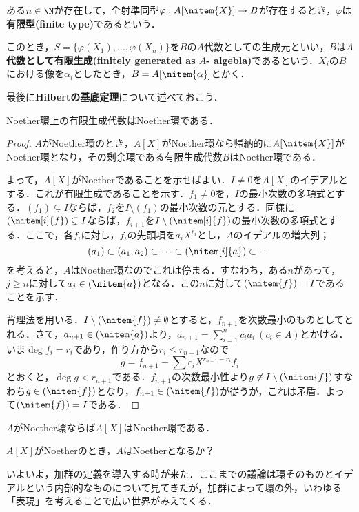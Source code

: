 \begin{defi}[有限型]
	ある$n\in\N$が存在して，全射準同型$\varphi:A[\nitem{X}]\to B$が存在するとき，$\varphi$は\textbf{有限型(finite type)}であるという．
\end{defi}

このとき，$S=\{\varphi(X_1),\dots,\varphi(X_n)\}$を$B$の$A$代数としての生成元といい，$B$は$A$\textbf{代数として有限生成(finitely generated as $A$- algebla)}であるという．$X_i$の$B$における像を$\alpha_i$としたとき，$B=A[\nitem{\alpha}]$とかく．

最後に\textbf{Hilbertの基底定理}について述べておこう．
\begin{thm}[Hilbertの基底定理]\label{thm:Hilbertの基底定理}
	Noether環上の有限生成代数はNoether環である．
\end{thm}
\begin{proof}
	$A$がNoether環のとき，$A[X]$がNoether環なら帰納的に$A[\nitem{X}]$がNoether環となり，その剰余環である有限生成代数$B$はNoether環である．
	
	よって，$A[X]$がNoetherであることを示せばよい．$I\neq0$を$A[X]$のイデアルとする．これが有限生成であることを示す．$f_1\neq0$を，$I$の最小次数の多項式とする．$(f_1)\subsetneq I$ならば，$f_2$を$I\setminus(f_1)$の最小次数の元とする．同様に$(\nitem[i]{f})\subsetneq I$ならば，$f_{i+1}$を$I\setminus(\nitem[i]{f})$の最小次数の多項式とする．ここで，各$f_i$に対し，$f_i$の先頭項を$a_iX^{r_i}$とし，$A$のイデアルの増大列；
	\[(a_1)\subset(a_1,a_2)\subset\dots\subset(\nitem[i]{a})\subset\cdots\]
	を考えると，$A$はNoether環なのでこれは停まる．すなわち，ある$n$があって，$j\geq n$に対して$a_j\in(\nitem{a})$となる．この$n$に対して$(\nitem{f})=I$であることを示す．
	
	背理法を用いる．$I\setminus(\nitem{f})\neq\emptyset$とすると，$f_{n+1}$を次数最小のものとしてとれる．さて，$a_{n+1}\in(\nitem{a})$より，$a_{n+1}=\sum_{i=1}^n c_ia_i~(c_i\in A)$とかける．いま$\deg{f_i}=r_i$であり，作り方から$r_i\leq r_{n+1}$なので
	\[g=f_{n+1}-\sum c_iX^{r_{n+1}-r_i}f_i\]
	とおくと，$\deg g<r_{n+1}$である．$f_{n+1}$の次数最小性より$g\not\in I\setminus(\nitem{f})$すなわち$g\in(\nitem{f})$となり，$f_{n+1}\in(\nitem{f})$が従うが，これは矛盾．よって$(\nitem{f})=I$である．
\end{proof}

\begin{cor}
	$A$がNoether環ならば$A[X]$はNoether環である．
\end{cor}

\begin{exer}
	$A[X]$がNoetherのとき，$A$はNoetherとなるか？
\end{exer}

いよいよ，加群の定義を導入する時が来た．ここまでの議論は環そのものとイデアルという内部的なものについて見てきたが，加群によって環の外，いわゆる「表現」を考えることで広い世界がみえてくる．